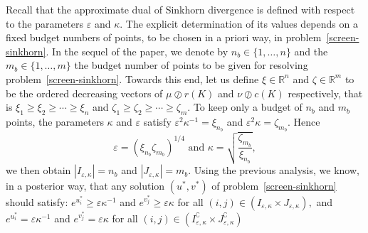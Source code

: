 \documentclass{article}
\newcommand{\R}{{\mathbb{R}}}
\begin{document}
Recall that the approximate dual of Sinkhorn divergence is defined with respect to the parameters $\varepsilon$ and $\kappa$. 
The explicit determination of its values depends on a fixed budget numbers of points, to be chosen in a priori way, in problem~\eqref{screen-sinkhorn}.  
In the sequel of the paper, we denote by $n_b \in\{1, \ldots, n\}$ and the $m_b\in\{1, \ldots, m\}$ the budget number of points to be given for resolving problem~\eqref{screen-sinkhorn}. 
Towards this end, let us define $\xi \in \R^n$ and $\zeta \in \R^m$ to be the ordered decreasing vectors of $\mu \oslash r(K)$ and $\nu \oslash c(K)$ respectively, that is $\xi_1 \geq \xi_2 \geq \cdots \geq \xi_n$ and $\zeta_1 \geq \zeta_2 \geq \cdots \geq \zeta_m$.
To keep only a budget of $n_b$ and $m_b$ points, the parameters $\kappa$ and $\varepsilon$ satisfy ${\varepsilon^2}\kappa^{-1} = \xi_{n_b}$ and $\varepsilon^2\kappa = \zeta_{m_b}$. Hence 
\begin{equation}
\label{epsilon_kappa}
 \varepsilon = (\xi_{n_b}\zeta_{m_b})^{1/4} \text{ and } \kappa = \sqrt{\frac{\zeta_{m_b}}{\xi_{n_b}}},
\end{equation}
we then obtain $|I_{\varepsilon, \kappa}| = n_b$ and $|J_{\varepsilon, \kappa}| = m_b$.  %
Using the previous analysis, we know, in a posterior way, that any solution $(u^*, v^*)$ of problem~\eqref{screen-sinkhorn} should satisfy: $e^{u^*_i} \geq \varepsilon\kappa^{-1}$ and $e^{v^*_j} \geq \varepsilon\kappa$ for all $(i,j) \in (I_{\varepsilon,\kappa}\times J_{\varepsilon,\kappa}),$ and $e^{u^*_i} = \varepsilon\kappa^{-1}$ and $e^{v^*_j} = \varepsilon\kappa$ for all $(i,j) \in (I^\complement_{\varepsilon,\kappa}\times J^\complement_{\varepsilon,\kappa})$
\end{document}
